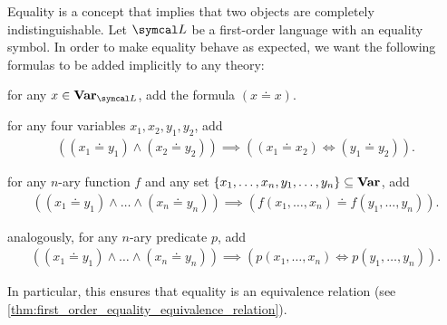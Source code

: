 \begin{note}\label{note:first_order_equality}\cite[definition 5.1]{Nerode2012}
  Equality is a concept that implies that two objects are completely indistinguishable. Let \( \Cal{L} \) be a first-order language with an equality symbol. In order to make equality behave as expected, we want the following formulas to be added implicitly to any theory:

  \begin{defenum}
    \item\label{note:first_order_equality/reflexivity} for any \( x \in \Bold{Var}_{\Cal{L}} \), add the formula \( (x \doteq x) \).
    \item\label{note:first_order_equality/equality} for any four variables \( x_1, x_2, y_1, y_2 \), add
    \begin{align*}
      ((x_1 \doteq y_1) \land (x_2 \doteq y_2)) \implies ((x_1 \doteq x_2) \iff (y_1 \doteq y_2)).
    \end{align*}

    \item\label{note:first_order_equality/functions} for any \( n \)-ary function \( f \) and any set \( \{ x_1, \ldots, x_n, y_1, \ldots, y_n \} \subseteq \operatorname{\mathbf{Var}} \), add
    \begin{align*}
      ((x_1 \doteq y_1) \land \ldots \land (x_n \doteq y_n)) \implies (f(x_1, \ldots, x_n) \doteq f(y_1, \ldots, y_n)).
    \end{align*}

    \item\label{note:first_order_equality/predicates} analogously, for any \( n \)-ary predicate \( p \), add
    \begin{align*}
      ((x_1 \doteq y_1) \land \ldots \land (x_n \doteq y_n)) \implies (p(x_1, \ldots, x_n) \iff p(y_1, \ldots, y_n)).
    \end{align*}
  \end{defenum}

  In particular, this ensures that equality is an equivalence relation (see \cref{thm:first_order_equality_equivalence_relation}).
\end{note}

